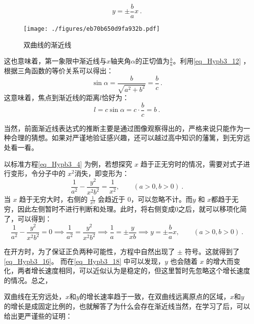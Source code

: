 \begin{equation}\label{eq_Hypb3_16}
y=\pm\frac{b}{a}x~.
\end{equation}

\begin{figure}[ht]
\centering
\texttt{[image: ./figures/eb70b650d9fa932b.pdf]}
\caption{双曲线的渐近线} \label{fig_Hypb3_1}
\end{figure}

这也意味着，第一象限中渐近线与$x$轴夹角$\alpha$的正切值为$\displaystyle\frac{b}{a}$。利用\autoref{eq_Hypb3_12} ，根据三角函数的等价关系可以得出：
\begin{equation}
\sin\alpha=\frac{b}{\sqrt{a^2+b^2}}=\frac{b}{c}~.
\end{equation}
这意味着，焦点到渐近线的距离$l$恰好为：
\begin{equation}\label{eq_Hypb3_11}
l=c\sin\alpha = c\cdot \frac{b}{c} = b~.
\end{equation}

当然，前面渐近线表达式的推断主要是通过图像观察得出的，严格来说只能作为一种合理的猜想。如果对严谨地验证感兴趣，还可以越过高中知识的藩篱，到无穷远处看一看。

以标准方程\autoref{eq_Hypb3_4} 为例，若想探究 $x$ 趋于正无穷时的情况，需要对式子进行变形，令分子中的 $x^2$消失，即变形为：
\begin{equation}
\frac{1}{a^2} - \frac{y^2}{x^2b^2} =  \frac{1}{x^2} ,\qquad(a>0,b>0)~.
\end{equation}
当 $x$ 趋于无穷大时，右侧的 $\frac{1}{x^2}$ 会趋近于 $0$，可以忽略不计。而$y$ 和 $x$都趋于无穷，因此左侧暂时不进行判断和处理。此时，将右侧变成$0$之后，就可以移项化简了，可以得到：
\begin{equation}\label{eq_Hypb3_18}
\frac{1}{a^2} - \frac{y^2}{x^2b^2} = 0 \implies\frac{1}{a^2} = \frac{y^2}{x^2b^2}\implies \frac{1}{a} = \pm\frac{y}{xb}\implies y=\pm\frac{b}{a}x,\qquad(a>0,b>0)~.
\end{equation}

在开方时，为了保证正负两种可能性，方程中自然出现了 $\pm$ 符号。这就得到了\autoref{eq_Hypb3_16}。
而在\autoref{eq_Hypb3_18} 中可以发现，$y$ 也会随着 $x$ 的增大而变化，两者增长速度相同，可以近似认为是稳定的，但这里暂时先忽略这个增长速度的情况。总之，

双曲线在无穷远处，$x$和$y$的增长速率趋于一致，在双曲线远离原点的区域，$x$和$y$的增长是成固定比例的，也就解答了为什么会存在渐近线当然，在学习了后，可以给出更严谨些的证明：

